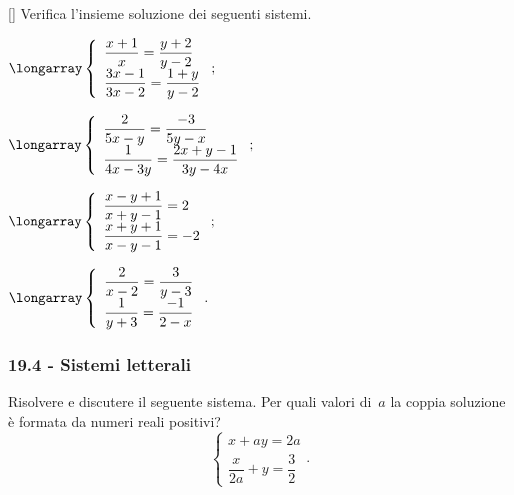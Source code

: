 \begin{esercizio}
 \label{ese:19.51}[\Ast]
Verifica l'insieme soluzione dei seguenti sistemi.
\begin{multicols}{2}
\begin{enumeratea}
\item $\longarray\left\{\begin{array}{l}{\dfrac{x+1}{x}=\dfrac{y+2}{y-2}}\\{\dfrac{3x-1}{3x-2}=\dfrac{1+y}{y-2}}\end{array}\right.;$
\item $\longarray\left\{\begin{array}{l}{\dfrac{2}{5x-y}=\dfrac{-3}{5y-x}}\\{\dfrac{1}{4x-3y}=\dfrac{2x+y-1}{3y-4x}}\end{array}\right.;$
\item $\longarray\left\{\begin{array}{l}{\dfrac{x-y+1}{x+y-1}=2}\\{\dfrac{x+y+1}{x-y-1}=-2}\end{array}\right.;$
\item $\longarray\left\{\begin{array}{l}{\dfrac{2}{x-2}=\dfrac{3}{y-3}}\\{\dfrac{1}{y+3}=\dfrac{-1}{2-x}}\end{array}\right..$
\end{enumeratea}
\end{multicols}
\end{esercizio}
\subsubsection*{19.4 - Sistemi letterali}

\begin{esercizio}[\Ast]
 \label{ese:19.52}
Risolvere e discutere il seguente sistema. Per quali valori di~$a$ la coppia soluzione è formata da
numeri reali positivi?
\[\left\{\begin{array}{l}{x+ay=2a}\\\dfrac{x}{2a}+y=\dfrac{3}{2}\end{array}\right..\]
\end{esercizio}


